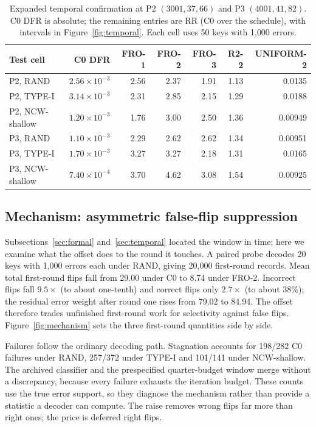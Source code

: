 \documentclass[lettersize,journal]{IEEEtran}
\begin{document}
\begin{table}[!t]
\centering
\small
\caption{Expanded temporal confirmation at P2 $(3001,37,66)$ and P3 $(4001,41,82)$. C0 DFR is absolute; the remaining entries are RR (C0 over the schedule), with intervals in Figure~\ref{fig:temporal}. Each cell uses 50 keys with 1{,}000 errors.}
\label{tab:temporal}
\begin{tabular}{l r rrrrr}
\toprule
Test cell & C0 DFR & FRO-1 & FRO-2 & FRO-3 & R2-2 & UNIFORM-2 \\
\midrule
P2, RAND & $2.56\times10^{-3}$ & 2.56 & 2.37 & 1.91 & 1.13 & 0.0135 \\
P2, TYPE-I & $3.14\times10^{-3}$ & 2.31 & 2.85 & 2.15 & 1.29 & 0.0188 \\
P2, NCW-shallow & $1.20\times10^{-3}$ & 1.76 & 3.00 & 2.50 & 1.36 & 0.00949 \\
P3, RAND & $1.10\times10^{-3}$ & 2.29 & 2.62 & 2.62 & 1.34 & 0.00951 \\
P3, TYPE-I & $1.70\times10^{-3}$ & 3.27 & 3.27 & 2.18 & 1.31 & 0.0165 \\
P3, NCW-shallow & $7.40\times10^{-4}$ & 3.70 & 4.62 & 3.08 & 1.54 & 0.00925 \\
\bottomrule
\end{tabular}
\end{table}
\subsection{Mechanism: asymmetric false-flip suppression}\label{sec:mechanism}

Subsections~\ref{sec:formal} and~\ref{sec:temporal} located the window in time; here we examine what the offset does to the round it touches. A paired probe decodes 20 keys with 1{,}000 errors each under RAND, giving 20{,}000 first-round records. Mean total first-round flips fall from 29.00 under C0 to 8.74 under FRO-2. Incorrect flips fall $9.5\times$ (to about one-tenth) and correct flips only $2.7\times$ (to about 38\%); the residual error weight after round one rises from 79.02 to 84.94. The offset therefore trades unfinished first-round work for selectivity against false flips. Figure~\ref{fig:mechanism} sets the three first-round quantities side by side.

Failures follow the ordinary decoding path. Stagnation accounts for 198/282 C0 failures under RAND, 257/372 under TYPE-I and 101/141 under NCW-shallow. The archived classifier and the prespecified quarter-budget window merge without a discrepancy, because every failure exhausts the iteration budget. These counts use the true error support, so they diagnose the mechanism rather than provide a statistic a decoder can compute. The raise removes wrong flips far more than right ones; the price is deferred right flips.
\end{document}
